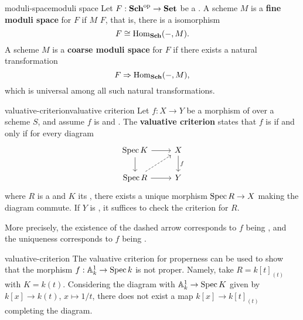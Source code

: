 \begin{topic}{moduli-space}{moduli space}
    Let $F : \textbf{Sch}^\textup{op} \to \textbf{Set}$ be a .
    A scheme $M$ is a \textbf{fine moduli space} for $F$ if $M$  $F$, that is, there is a  isomorphism
    \[ F \cong \operatorname{Hom}_\textbf{Sch}(-, M) . \]
    A scheme $M$ is a \textbf{coarse moduli space} for $F$ if there exists a natural transformation
    \[ F \Rightarrow \operatorname{Hom}_\textbf{Sch}(-, M) , \]
    which is universal among all such natural transformations.
\end{topic}

\begin{topic}{valuative-criterion}{valuative criterion}
    Let $f : X \to Y$ be a morphism of  over a scheme $S$, and assume $f$ is  and . The \textbf{valuative criterion} states that $f$ is  if and only if for every diagram
    \[ \begin{tikzcd}
        \Spec K \arrow{r} \arrow{d} & X \arrow{d}{f} \\ \Spec R \arrow[dashed]{ur} \arrow{r} & Y
    \end{tikzcd} \]
    where $R$ is a  and $K$ its , there exists a unique morphism $\operatorname{Spec} R \to X$ making the diagram commute. If $Y$ is , it suffices to check the criterion for  $R$.
    
    More precisely, the existence of the dashed arrow corresponds to $f$ being , and the uniqueness corresponds to $f$ being .
\end{topic}

\begin{example}{valuative-criterion}
    The valuative criterion for properness can be used to show that the morphism $f : \mathbb{A}^1_k \to \operatorname{Spec} k$ is not proper. Namely, take $R = k[t]_{(t)}$ with $K = k(t)$. Considering the diagram with $\mathbb{A}^1_k \to \operatorname{Spec} K$ given by $k[x] \to k(t)$, $x \mapsto 1/t$, there does not exist a map $k[x] \to k[t]_{(t)}$ completing the diagram.
\end{example}

